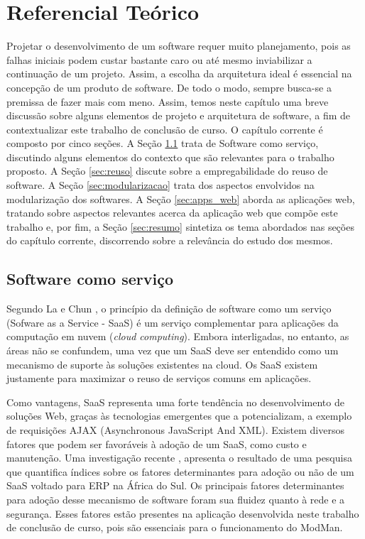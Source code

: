 \chapter{Referencial Teórico}


Projetar o desenvolvimento de um software requer muito planejamento, pois as falhas iniciais podem custar bastante caro ou até mesmo inviabilizar a continuação de um projeto. Assim, a escolha da arquitetura ideal é essencial na concepção de um produto de software. 
De todo o modo, sempre busca-se a premissa de fazer mais com meno. Assim, temos neste capítulo uma breve discussão sobre alguns elementos de projeto e arquitetura de software, a fim de contextualizar este trabalho de conclusão de curso.
O capítulo corrente é composto por cinco seções. A Seção \ref{sec:saas} trata de Software como serviço, discutindo alguns elementos do contexto que são relevantes para o trabalho proposto. A Seção \ref{sec:reuso} discute sobre a empregabilidade do reuso de software. A Seção \ref{sec:modularizacao} trata dos aspectos envolvidos na modularização dos softwares. A Seção \ref{sec:apps_web} aborda as aplicações web, tratando sobre aspectos relevantes acerca da  aplicação web que compõe este trabalho e, por fim, a Seção \ref{sec:resumo} sintetiza os tema abordados nas seções do capítulo corrente, discorrendo sobre a relevância do estudo dos mesmos.


\section{Software como serviço}\label{sec:saas}


Segundo La e Chun \citep{La2009Systematic}, o princípio da definição de software como um serviço (Sofware as a Service - SaaS) é um serviço complementar para aplicações da computação em nuvem (\textit{cloud computing}). Embora interligadas, no entanto, as áreas não se confundem, uma vez que um SaaS deve ser entendido como um mecanismo de suporte às soluções existentes na cloud. Os SaaS existem justamente para maximizar o reuso de serviços comuns em aplicações.


Como vantagens, SaaS representa uma forte tendência no desenvolvimento de soluções Web, graças às tecnologias emergentes que a potencializam, a exemplo de requisições AJAX (Asynchronous JavaScript And XML). Existem diversos fatores que podem ser favoráveis à adoção de um SaaS, como custo e manutenção. Uma investigação recente \citep{LechesaSS11}, apresenta o resultado de uma pesquisa que quantifica índices sobre os fatores determinantes para adoção ou não de um SaaS voltado para ERP na África do Sul. Os principais fatores determinantes para adoção desse mecanismo de software foram sua fluidez quanto à rede e a segurança. Esses fatores estão presentes na aplicação desenvolvida neste trabalho de conclusão de curso, pois são essenciais para o funcionamento do ModMan.


